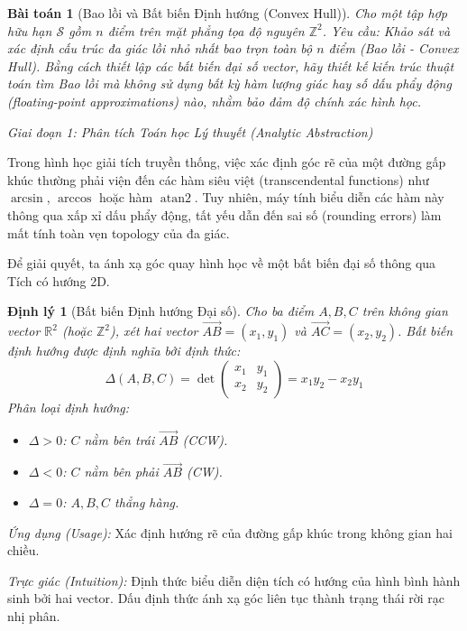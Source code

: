 \documentclass{article}
\newtheorem{baitoan}{Bài toán}
\newtheorem{dinhly}{Định lý}
\begin{document}
\begin{baitoan}[Bao lồi và Bất biến Định hướng (Convex Hull)]
Cho một tập hợp hữu hạn $\mathcal{S}$ gồm $n$ điểm trên mặt phẳng tọa độ nguyên $\mathbb{Z}^2$. Yêu cầu: Khảo sát và xác định cấu trúc đa giác lồi nhỏ nhất bao trọn toàn bộ $n$ điểm (Bao lồi - Convex Hull). Bằng cách thiết lập các bất biến đại số vector, hãy thiết kế kiến trúc thuật toán tìm Bao lồi mà không sử dụng bất kỳ hàm lượng giác hay số dấu phẩy động (floating-point approximations) nào, nhằm bảo đảm độ chính xác hình học.
\end{baitoan}

\vspace{0.5em}\noindent\emph{Giai đoạn 1: Phân tích Toán học Lý thuyết (Analytic Abstraction)}

Trong hình học giải tích truyền thống, việc xác định góc rẽ của một đường gấp khúc thường phải viện đến các hàm siêu việt (transcendental functions) như $\arcsin$, $\arccos$ hoặc hàm $\operatorname{atan2}$. Tuy nhiên, máy tính biểu diễn các hàm này thông qua xấp xỉ dấu phẩy động, tất yếu dẫn đến sai số (rounding errors) làm mất tính toàn vẹn topology của đa giác.

Để giải quyết, ta ánh xạ góc quay hình học về một bất biến đại số thông qua Tích có hướng 2D.

\begin{dinhly}[Bất biến Định hướng Đại số]
Cho ba điểm $A, B, C$ trên không gian vector $\mathbb{R}^2$ (hoặc $\mathbb{Z}^2$), xét hai vector $\vec{AB} = (x_1, y_1)$ và $\vec{AC} = (x_2, y_2)$. Bất biến định hướng được định nghĩa bởi định thức:
\begin{equation*}
 \Delta(A, B, C) = \det \begin{pmatrix} x_1 & y_1 \\ x_2 & y_2 \end{pmatrix} = x_1 y_2 - x_2 y_1
\end{equation*}
Phân loại định hướng:
\begin{itemize}
 \item $\Delta > 0$: $C$ nằm bên trái $\vec{AB}$ (CCW).
 \item $\Delta < 0$: $C$ nằm bên phải $\vec{AB}$ (CW).
 \item $\Delta = 0$: $A, B, C$ thẳng hàng.
\end{itemize}
\end{dinhly}

\emph{Ứng dụng (Usage):} Xác định hướng rẽ của đường gấp khúc trong không gian hai chiều.

\emph{Trực giác (Intuition):} Định thức biểu diễn diện tích có hướng của hình bình hành sinh bởi hai vector. Dấu định thức ánh xạ góc liên tục thành trạng thái rời rạc nhị phân.
\end{document}
